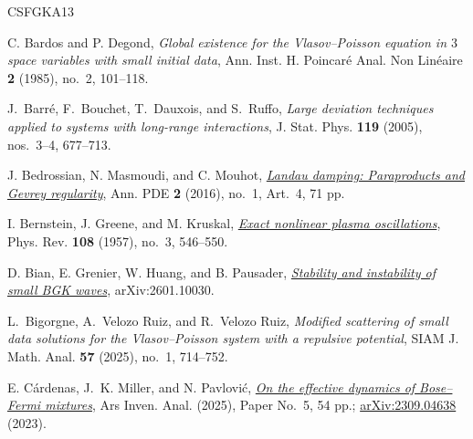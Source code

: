 \documentclass[10pt,reqno]{amsart}
\theoremstyle{definition}
\begin{document}
{\begin{enumerate}
\end{enumerate}






\begingroup
\setlength{\parskip}{0pt}
\begin{thebibliography}{CSFGKA13}
\fontsize{9pt}{10.3pt}\selectfont
\setlength{\itemsep}{1pt}
\setlength{\parsep}{0pt}




C. Bardos and P. Degond,
\emph{Global existence for the Vlasov--Poisson equation in $3$ space variables with small initial data},
Ann. Inst. H. Poincar\'e Anal. Non Lin\'eaire \textbf{2} (1985), no.~2, 101--118.

J.~Barr\'e, F.~Bouchet, T.~Dauxois, and S.~Ruffo,
\emph{Large deviation techniques applied to systems with long-range interactions},
J. Stat. Phys. \textbf{119} (2005), nos.~3--4, 677--713.



J. Bedrossian, N. Masmoudi, and C. Mouhot,
\href{https://link.springer.com/article/10.1007/s40818-016-0008-2}{\emph{Landau damping: Paraproducts and Gevrey regularity}},
Ann. PDE \textbf{2} (2016), no.~1, Art.~4, 71 pp.

I. Bernstein, J. Greene, and M. Kruskal,
\href{https://journals.aps.org/pr/abstract/10.1103/PhysRev.108.546}{\emph{Exact nonlinear plasma oscillations}},
Phys. Rev. \textbf{108} (1957), no.~3, 546--550.

D. Bian, E. Grenier, W. Huang, and B. Pausader,
\href{https://arxiv.org/abs/2601.10030}{\emph{Stability and instability of small BGK waves}},
arXiv:2601.10030.




L.~Bigorgne, A.~Velozo Ruiz, and R.~Velozo Ruiz,
\emph{Modified scattering of small data solutions for the Vlasov--Poisson system with a repulsive potential},
SIAM J. Math. Anal. \textbf{57} (2025), no.~1, 714--752.








E. C\'ardenas, J.~K. Miller, and N. Pavlovi\'c,
\href{https://arxiv.org/abs/2309.04638}{\emph{On the effective dynamics of Bose--Fermi mixtures}},
Ars Inven. Anal. (2025), Paper No.~5, 54 pp.; \href{https://arxiv.org/abs/2309.04638}{arXiv:2309.04638} (2023).





\end{thebibliography}}
\end{document}
